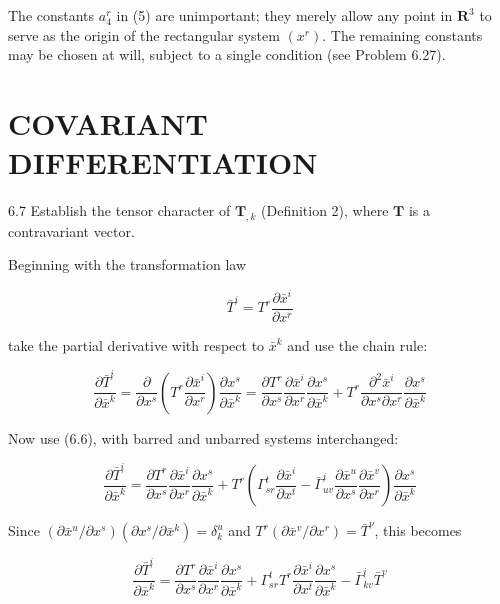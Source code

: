 \documentclass[10pt]{article}
\begin{document}
The constants $a_{4}^{r}$ in (5) are unimportant; they merely allow any point in $\mathbf{R}^{3}$ to serve as the origin of the rectangular system $\left(x^{r}\right)$. The remaining constants may be chosen at will, subject to a single condition (see Problem 6.27).

\section*{COVARIANT DIFFERENTIATION}
6.7 Establish the tensor character of $\mathbf{T}_{, k}$ (Definition 2), where $\mathbf{T}$ is a contravariant vector.

Beginning with the transformation law

$$
\bar{T}^{i}=T^{r} \frac{\partial \bar{x}^{i}}{\partial x^{r}}
$$

take the partial derivative with respect to $\bar{x}^{k}$ and use the chain rule:

$$
\frac{\partial \bar{T}^{i}}{\partial \bar{x}^{k}}=\frac{\partial}{\partial x^{s}}\left(T^{r} \frac{\partial \bar{x}^{i}}{\partial x^{r}}\right) \frac{\partial x^{s}}{\partial \bar{x}^{k}}=\frac{\partial T^{r}}{\partial x^{s}} \frac{\partial \bar{x}^{i}}{\partial x^{r}} \frac{\partial x^{s}}{\partial \bar{x}^{k}}+T^{r} \frac{\partial^{2} \bar{x}^{i}}{\partial x^{s} \partial x^{r}} \frac{\partial x^{s}}{\partial \bar{x}^{k}}
$$

Now use (6.6), with barred and unbarred systems interchanged:

$$
\frac{\partial \bar{T}^{i}}{\partial \bar{x}^{k}}=\frac{\partial T^{r}}{\partial x^{s}} \frac{\partial \bar{x}^{i}}{\partial x^{r}} \frac{\partial x^{s}}{\partial \bar{x}^{k}}+T^{r}\left(\Gamma_{s r}^{t} \frac{\partial \bar{x}^{i}}{\partial x^{t}}-\bar{\Gamma}_{u v}^{i} \frac{\partial \bar{x}^{u}}{\partial x^{s}} \frac{\partial \bar{x}^{v}}{\partial x^{r}}\right) \frac{\partial x^{s}}{\partial \bar{x}^{k}}
$$

Since $\left(\partial \bar{x}^{u} / \partial x^{s}\right)\left(\partial x^{s} / \partial \bar{x}^{k}\right)=\delta_{k}^{u}$ and $T^{r}\left(\partial \bar{x}^{v} / \partial x^{r}\right)=\bar{T}^{\nu}$, this becomes

$$
\frac{\partial \bar{T}^{i}}{\partial \bar{x}^{k}}=\frac{\partial T^{r}}{\partial x^{s}} \frac{\partial \bar{x}^{i}}{\partial x^{r}} \frac{\partial x^{s}}{\partial \bar{x}^{k}}+\Gamma_{s r}^{t} T^{r} \frac{\partial \bar{x}^{i}}{\partial x^{t}} \frac{\partial x^{s}}{\partial \bar{x}^{k}}-\bar{\Gamma}_{k v}^{i} \bar{T}^{v}
$$
\end{document}
